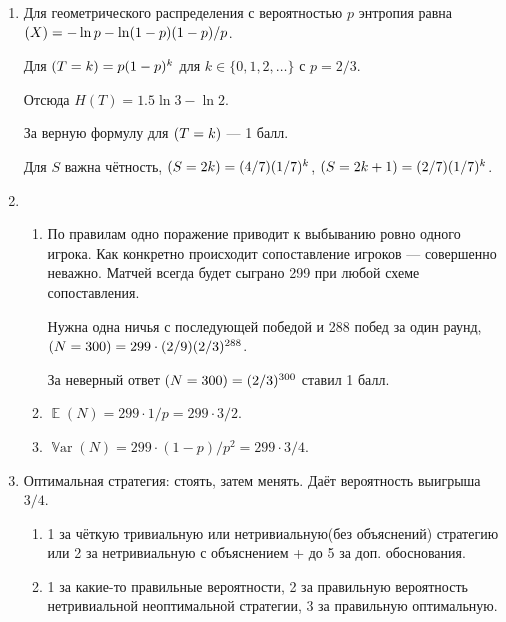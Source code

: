 \documentclass[12pt]{article}
\DeclareMathOperator{\Var}{\mathbb{V}ar}
\let\P\relax
\DeclareMathOperator{\P}{\mathbb{P}}
\let\H\relax
\DeclareMathOperator{\H}{\mathbb{H}}
\DeclareMathOperator{\E}{\mathbb{E}}
\begin{document}
\begin{enumerate}
\begin{enumerate}
\end{enumerate}
\item Для геометрического распределения с вероятностью $p$ 
    энтропия равна $\H(X) = -\ln p - \ln (1 - p) (1 - p) / p$.

    Для $\P(T = k) = p (1 - p)^k$ для $k \in \{0, 1, 2, \dots \}$ с $p = 2/3$.
    
    Отсюда $H(T) = 1.5 \ln 3 - \ln 2$. 
    
    За верную формулу для $\P(T = k)$ — 1 балл. 

    Для $S$ важна чётность, $\P(S = 2k) = (4/7)(1/7)^k$,
    $\P(S = 2k + 1) = (2/7) (1/7)^k$.

    \item 

    \begin{enumerate}
        \item По правилам одно поражение приводит к выбыванию ровно одного игрока.
        Как конкретно происходит сопоставление игроков — совершенно неважно. 
        Матчей всегда будет сыграно 299 при любой схеме сопоставления. 

        Нужна одна ничья с последующей победой и 288 побед за один раунд, $\P(N = 300) = 299 \cdot (2/9) (2/3)^{288}$.
        
        За неверный ответ $\P(N = 300) = (2/3)^{300}$ ставил 1 балл.
        \item $\E(N) = 299 \cdot 1/p = 299 \cdot 3 /2$.
        \item $\Var(N) = 299 \cdot (1-p)/p^2 = 299 \cdot 3/4$.
    \end{enumerate}

    \item Оптимальная стратегия: стоять, затем менять. Даёт вероятность выигрыша $3/4$. 
    \begin{enumerate}
    \item 1 за чёткую тривиальную или нетривиальную(без объяснений) стратегию или 2 за нетривиальную с объяснением + до 5 за доп. обоснования.
    \item 1 за какие-то правильные вероятности, 2 за правильную вероятность нетривиальной неоптимальной стратегии, 3 за правильную оптимальную. 
    \end{enumerate}
    

\end{enumerate}
\end{document}
